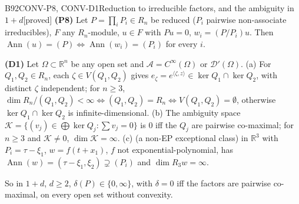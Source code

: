 \documentclass[11pt,a4paper,oneside]{report}
\newcommand{\badge}[2]{\textcolor{#1}{\textsf{\footnotesize[#2]}}}
\newcommand{\proved}{\badge{cC}{proved}}
\newcommand{\R}{\mathbb{R}}\newcommand{\C}{\mathbb{C}}\newcommand{\N}{\mathbb{N}}\newcommand{\Z}{\mathbb{Z}}\newcommand{\Q}{\mathbb{Q}}
\newcommand{\Ann}{\operatorname{Ann}}
\newenvironment{dimcard}[5]{\par\Needspace{12\baselineskip}\begin{dimcardbox}{#1}{#2}{#3}{#4}{#5}}{\end{dimcardbox}}
\begin{document}
\begin{dimcard}{B92}{CONV-P8, CONV-D1}{Reduction to irreducible factors, and the ambiguity in $1+d$}{\proved}{}
\textbf{(P8)} Let $P=\prod_iP_i\in R_n$ be reduced ($P_i$ pairwise non-associate irreducibles), $F$ any $R_n$-module, $u\in F$ with $Pu=0$, $w_i=(P/P_i)u$. Then $\Ann(u)=(P)\iff\Ann(w_i)=(P_i)$ for every $i$.

\textbf{(D1)} Let $\Omega\subset\R^n$ be any open set and $\mathcal A=C^\infty(\Omega)$ or $\mathcal D'(\Omega)$. (a) For $Q_1,Q_2\in R_n$, each $\zeta\in V(Q_1,Q_2)$ gives $e_\zeta=e^{\langle\zeta,z\rangle}\in\ker Q_1\cap\ker Q_2$, with distinct $\zeta$ independent; for $n\ge3$, $\dim R_n/(Q_1,Q_2)<\infty\iff(Q_1,Q_2)=R_n\iff V(Q_1,Q_2)=\emptyset$, otherwise $\ker Q_1\cap\ker Q_2$ is infinite-dimensional. (b) The ambiguity space $\mathcal K=\{(v_j)\in\bigoplus\ker Q_j:\sum v_j=0\}$ is $0$ iff the $Q_j$ are pairwise co-maximal; for $n\ge3$ and $\mathcal K\ne0$, $\dim\mathcal K=\infty$. (c) (a non-EP exceptional class) in $\R^3$ with $P_i=\tau-\xi_1$, $w=f(t+x_1)$, $f$ not exponential-polynomial, has $\Ann(w)=(\tau-\xi_1,\xi_2)\supsetneq(P_i)$ and $\dim R_3w=\infty$.

So in $1+d$, $d\ge2$, $\delta(P)\in\{0,\infty\}$, with $\delta=0$ iff the factors are pairwise co-maximal, on every open set without convexity.
\end{dimcard}
\end{document}
